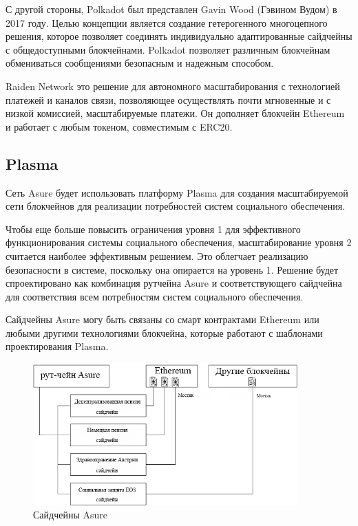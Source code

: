 С другой стороны, Polkadot был представлен Gavin Wood (Гэвином Вудом) в 2017 году. Целью концепции является создание гетерогенного многоцепного решения, которое позволяет соединять индивидуально адаптированные сайдчейны с общедоступными блокчейнами. Polkadot позволяет различным блокчейнам обмениваться сообщениями безопасным и надежным способом.

Raiden Network это решение для автономного масштабирования с технологией платежей и каналов связи, позволяющее осуществлять почти мгновенные и с низкой комиссией, масштабируемые платежи. Он дополняет блокчейн Ethereum и работает с любым токеном, совместимым с ERC20.

\subsection{Plasma}
Сеть Asure будет использовать платформу Plasma для создания масштабируемой сети блокчейнов для реализации потребностей систем социального обеспечения. 

Чтобы еще больше повысить ограничения уровня 1 для эффективного функционирования системы социального обеспечения, масштабирование уровня 2 считается наиболее эффективным решением. Это облегчает реализацию безопасности в системе, поскольку она опирается на уровень 1. Решение будет спроектировано как комбинация рутчейна Asure и соответствующего сайдчейна для соответствия всем потребностям систем социального обеспечения.

Сайдчейны Asure могу быть связаны со смарт контрактами Ethereum или любыми другими технологиями блокчейна, которые работают с шаблонами проектирования Plasma.


\begin{figure}[H]
    \centering
    \includegraphics[width=4.0in]{img/chains.png}
    \caption{Сайдчейны Asure}
    \label{fig:asure_side_chains}
\end{figure}
